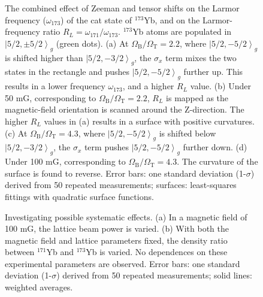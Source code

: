 \documentclass[pdflatex,sn-nature,centre]{sn-jnl}%
\begin{document}
\begin{figure}[htbp]
    \centering
    \caption{The combined effect of Zeeman and tensor shifts on the Larmor frequency ($\omega_{173}$) of the cat state of $^{173}$Yb, and on the Larmor-frequency ratio $R_L=\omega_{171}/\omega_{173}$. $^{173}$Yb atoms are populated in $\left\vert5/2,\pm5/2\right\rangle_g$ (green dots). 
    (a) At $\Omega_{\mathrm B}/\Omega_{\mathrm T}=2.2$, where $\left\vert5/2,-5/2\right\rangle_g$ is shifted higher than $\left\vert5/2,-3/2\right\rangle_g$, the $\sigma_x$ term mixes the two states in the rectangle and pushes $\left\vert5/2,-5/2\right\rangle_g$ further up. This results in a lower frequency $\omega_{173}$, and a higher $R_L$ value.
    (b) Under 50 mG, corresponding to $\Omega_{\mathrm B}/\Omega_{\mathrm T}=2.2$, $R_L$ is mapped as the magnetic-field orientation is scanned around the Z-direction. The higher $R_L$ values in (a) results in a surface with positive curvatures.
    (c) At $\Omega_{\mathrm B}/\Omega_{\mathrm T}=4.3$, where $\left\vert5/2,-5/2\right\rangle_g$ is shifted below $\left\vert5/2,-3/2\right\rangle_g$, the $\sigma_x$ term pushes $\left\vert5/2,-5/2\right\rangle_g$ further down.
    (d) Under 100 mG, corresponding to $\Omega_{\mathrm B}/\Omega_{\mathrm T}=4.3$. The curvature of the surface is found to reverse.
    Error bars: one standard deviation (1-$\sigma$) derived from 50 repeated measurements; surfaces: least-squares fittings with quadratic surface functions.
    }
    \label{fig2}
\end{figure}


\begin{figure}[htbp]
    \centering
    \caption{Investigating possible systematic effects.
    (a) In a magnetic field of 100 mG, the lattice beam power is varied.
    (b) With both the magnetic field and lattice parameters fixed, the density ratio between $^{171}$Yb and $^{173}$Yb is varied. No dependences on these experimental parameters are observed.
    Error bars: one standard deviation (1-$\sigma$) derived from 50 repeated measurements; solid lines: weighted averages.
    }
    \label{fig3}
\end{figure}





\end{document}
